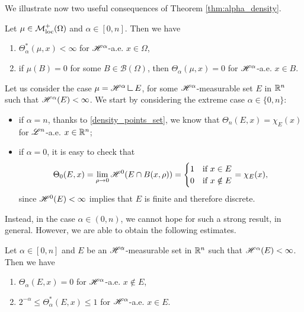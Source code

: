 We illustrate now two useful consequences of Theorem \ref{thm:alpha_density}.

\begin{corollary}
Let $\mu \in \mathcal{M}^{+}_{\rm loc}(\Omega)$ and $\alpha \in [0, n]$. Then we have
\begin{enumerate}
\item $\Theta^{*}_{\alpha}(\mu, x) < \infty$ for $\mathscr{H}^{\alpha}$-a.e. $x \in \Omega$,
\item if $\mu(B) = 0$ for some $B \in \mathcal{B}(\Omega)$, then $\Theta_{\alpha}(\mu, x) = 0$ for $\mathscr{H}^{\alpha}$-a.e. $x \in B$.
\end{enumerate}
\end{corollary}

Let us consider the case $\mu = \Haus{\alpha} \res E$, for some $\mathscr{H}^{\alpha}$-measurable set $E$ in $\mathbb{R}^{n}$ such that $\mathscr{H}^{\alpha}(E) < \infty$. We start by considering the extreme case $\alpha \in \{0, n\}$:
\begin{itemize}
\item if $\alpha = n$, thanks to \eqref{density_points_set}, we know that $\Theta_{n}(E, x) = \chi_{E}(x)$ for $\mathscr{L}^{n}$-a.e. $x \in \mathbb{R}^{n}$; 
\item if $\alpha = 0$, it is easy to check that
\begin{equation*}
\Theta_{0}(E, x) = \lim_{\rho \to 0} \mathscr{H}^{0}(E \cap B(x, \rho)) = \begin{cases} 1 & \text{if} \ x \in E \\
0 & \text{if} \ x \notin E
\end{cases} = \chi_{E}(x),
\end{equation*} 
since $\mathscr{H}^{0}(E) < \infty$ implies that $E$ is finite and therefore discrete.
\end{itemize}
Instead, in the case $\alpha \in (0, n)$, we cannot hope for such a strong result, in general. However, we are able to obtain the following estimates.

\begin{proposition}
Let $\alpha \in [0, n]$ and $E$ be an $\mathscr{H}^{\alpha}$-measurable set in $\mathbb{R}^{n}$ such that $\mathscr{H}^{\alpha}(E) < \infty$. Then we have
\begin{enumerate}
\item $\Theta_{\alpha}(E, x) = 0$ for $\mathscr{H}^{\alpha}$-a.e. $x \notin E$,
\item $2^{-\alpha} \le \Theta^{*}_{\alpha}(E, x) \le 1$ for $\mathscr{H}^{\alpha}$-a.e. $x \in E$.
\end{enumerate}
\end{proposition}

